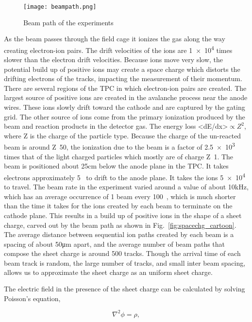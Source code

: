 \begin{figure}[H]
\texttt{[image: beampath.png]}
\caption{Beam path of the experiments}
\label{fig:beampaths}
\end{figure}


As the beam passes through the field cage it ionizes the gas along the way creating electron-ion pairs. The drift velocities of the ions are \num{1e4} times slower than the electron drift velocities. Because ions move very slow, the potential build up of positive ions may create a space charge which distorts the drifting electrons of the tracks, impacting the measurement of their momentum. There are several regions of the TPC in which electron-ion pairs are created. The largest source of positive ions are created in the avalanche process near the anode wires. These ions slowly drift toward the cathode and are captured by the gating grid. The other source of ions come from the primary ionization produced by the beam and reaction products in the detector gas. The energy loss <dE/dx>$\propto Z^2$, where Z is the charge of the particle type. Because the charge of the un-reacted beam is around Z~50, the ionization due to the beam is a factor of \num{2.5e3} times that of the light charged particles which mostly are of charge Z~1. 
 The beam is positioned about 25\si{\centi\metre} below the anode plane in the TPC. It takes electrons approximately 5\si{\micro\sec} to drift to the anode plane. It takes the ions \num{5e4}\si{\micro\sec} to travel. The beam rate in the experiment varied around a value of about 10\si{\kilo\hertz}, which has an average occurrence of 1 beam every 100\si{\micro\sec}, which is much shorter than the time it takes for the ions created by each beam to terminate on the cathode plane. This results in a build up of positive ions in the shape of a sheet charge, carved out by the beam path as shown in Fig.~\ref{fig:spacechg_cartoon}. The average distance between sequential ion paths created by each beam is a spacing of about 50\si{\micro\metre} apart, and the average number of beam paths that compose the sheet charge is around 500 tracks. 
Though the arrival time of each beam track is random, the large number of tracks, and small inter beam spacing, allows us to approximate the sheet charge as an uniform sheet charge. 

The electric field in the presence of the sheet charge can be calculated by solving Poisson's equation, 

\begin{equation}
\nabla^2 \phi = \rho,
\end{equation}

